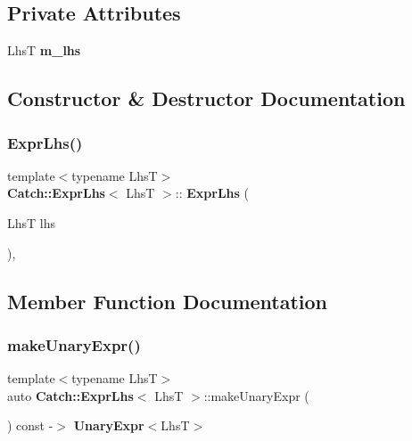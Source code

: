 \subsection*{Private Attributes}
\begin{DoxyCompactItemize}
\item 
LhsT \textbf{ m\+\_\+lhs}
\end{DoxyCompactItemize}


\subsection{Constructor \& Destructor Documentation}
\mbox{\label{class_catch_1_1_expr_lhs_ad22c6af1a7d6993240624d299714a479}} 
\subsubsection{ExprLhs()}
{\footnotesize\ttfamily template$<$typename LhsT$>$ \\
\textbf{ Catch\+::\+Expr\+Lhs}$<$ LhsT $>$\+::\textbf{ Expr\+Lhs} (\begin{DoxyParamCaption}\item[{LhsT}]{lhs }\end{DoxyParamCaption})\hspace{0.3cm}{\ttfamily [inline]}, {\ttfamily [explicit]}}



\subsection{Member Function Documentation}
\mbox{\label{class_catch_1_1_expr_lhs_ab68bd6d5d3ae21b7fba9010150fba95d}} 
\subsubsection{makeUnaryExpr()}
{\footnotesize\ttfamily template$<$typename LhsT$>$ \\
auto \textbf{ Catch\+::\+Expr\+Lhs}$<$ LhsT $>$\+::make\+Unary\+Expr (\begin{DoxyParamCaption}{ }\end{DoxyParamCaption}) const -\/$>$ \textbf{ Unary\+Expr}$<$LhsT$>$ \hspace{0.3cm}{\ttfamily [inline]}}

